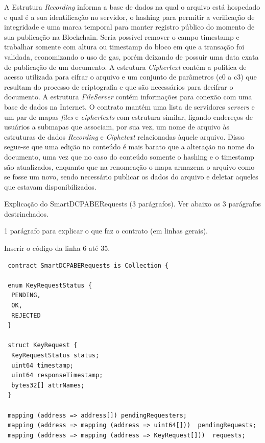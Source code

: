 \documentclass[a4paper,11pt]{article}
\begin{document}
A Estrutura \emph{Recording} informa a base de dados na qual o arquivo está hospedado e qual é a sua identificação no servidor, o hashing para permitir a verificação de integridade e uma marca temporal para manter registro público do momento de sua publicação na Blockchain. Seria possível remover o campo timestamp e trabalhar somente com altura ou timestamp do bloco em que a transação foi validada, economizando o uso de gas, porém deixando de possuir uma data exata de publicação de um documento. A estrutura \emph{Ciphertext} contém a política de acesso utilizada para cifrar o arquivo e um conjunto de parâmetros (c0 a c3) que resultam do processo de criptografia e que são necessários para decifrar o documento. A estrutura \emph{FileServer} contém informações para conexão com uma base de dados na Internet. O contrato mantém uma lista de servidores \emph{servers} e um par de mapas \emph{files} e \emph{ciphertexts} com estrutura similar, ligando endereços de usuários a submapas que associam, por sua vez, um nome de arquivo às estruturas de dados \emph{Recording} e \emph{Ciphetext} relacionadas àquele arquivo. Disso segue-se que uma edição no conteúdo é mais barato que a alteração no nome do documento, uma vez que no caso do conteúdo somente o hashing e o timestamp são atualizados, enquanto que na renomeação o mapa armazena o arquivo como se fosse um novo, sendo necessário publicar os dados do arquivo e deletar aqueles que estavam disponibilizados.

{\color{ForestGreen} Explicação do  SmartDCPABERequests  (3 parágrafos). Ver abaixo os 3 parágrafos destrinchados.}

{\color{Magenta} 1 parágrafo para explicar o que faz o contrato (em linhas gerais).}

{\color{Magenta} Inserir o código da linha 6 até 35.}

\begin{lstlisting}
 contract SmartDCPABERequests is Collection {

 enum KeyRequestStatus {
  PENDING,
  OK,
  REJECTED
 }

 struct KeyRequest {
  KeyRequestStatus status;
  uint64 timestamp;
  uint64 responseTimestamp;
  bytes32[] attrNames;
 }

 mapping (address => address[]) pendingRequesters;
 mapping (address => mapping (address => uint64[]))  pendingRequests;
 mapping (address => mapping (address => KeyRequest[]))  requests;
\end{lstlisting}
\end{document}
